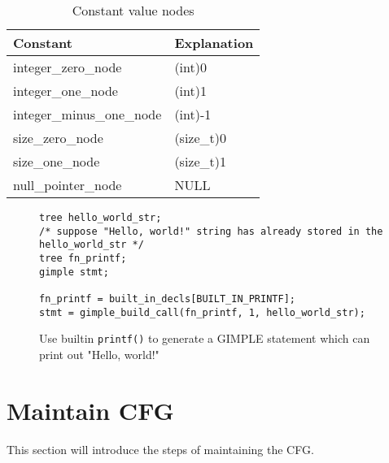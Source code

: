 \documentclass[11pt]{article}
\begin{document}
\begin{table}
\begin{center}
\begin{tabular}{|l|l|}
\hline
Constant & Explanation \\ \hline
integer\_zero\_node & (int)0 \\
integer\_one\_node & (int)1 \\
integer\_minus\_one\_node & (int)-1 \\
size\_zero\_node & (size\_t)0 \\
size\_one\_node & (size\_t)1 \\
null\_pointer\_node & NULL \\
\hline
\end{tabular}
\end{center}
\caption{Constant value nodes}
\label{tab:constant-value-nodes}
\end{table}

\begin{figure}
\begin{lstlisting}
tree hello_world_str;
/* suppose "Hello, world!" string has already stored in the hello_world_str */
tree fn_printf;
gimple stmt;

fn_printf = built_in_decls[BUILT_IN_PRINTF];
stmt = gimple_build_call(fn_printf, 1, hello_world_str);
\end{lstlisting}
\caption{Use builtin \texttt{printf()} to generate a GIMPLE statement which can print out "Hello, world!"}
\label{fig:print-hello-world}
\end{figure}

\pagebreak
\section{Maintain CFG}
This section will introduce the steps of maintaining the CFG. 
\end{document}
